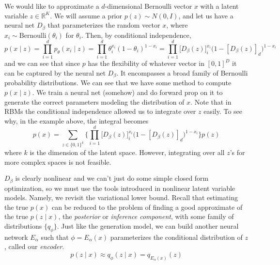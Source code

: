   \begin{example}
    \label{ex:bernoulli-bernoulli-rbm}
 
    We would like to approximate a $d$-dimensional Bernoulli vector $x$ with a latent variable $z \in \mathbb{R}^K$. We will assume a prior $p(z) \sim N(0, I)$, and let us have a neural net $D_{\beta}$ that parameterizes the random vector $x$, where $x_i \sim \mathrm{Bernoulli}(\theta_i)$ for $\theta_i$. Then, by conditional independence, 
    \begin{equation}
      p(x \mid z) = \prod_{i=1}^d p_\theta (x_i \mid z) = \prod_{i=1}^d \theta_i^{x_i} (1 - \theta_i)^{1 - x_i} = \prod_{i=1}^d \big[ D_\beta(z) \big]_i^{x_i} \big( 1 - [D_\beta(z)]_d \big)^{1 - x_i}
    \end{equation}
    and we can see that since $p$ has the flexibility of whatever vector in $[0, 1]^D$ it can be captured by the neural net $D_\beta$. It encompasses a broad family of Bernoulli probability distributions. We can see that we have some method to compute $p(x \mid z)$. We train a neural net (somehow) and do forward prop on it to generate the correct parameters modeling the distribution of $x$. Note that in RBMs the conditional independence allowed us to integrate over $z$ easily. To see why, in the example above, the integral becomes
    \begin{equation}
      p(x) = \sum_{z \in \{0, 1\}^k} \bigg\{ \prod_{i=1}^d \big[ D_\beta(z) \big]_i^{x_i} \big( 1 - [D_\beta(z)]_d \big)^{1 - x_i} \bigg\} p(z) 
    \end{equation}
    where $k$ is the dimension of the latent space. However, integrating over all $z$'s for more complex spaces is not feasible. 
  \end{example}

  $D_\beta$ is clearly nonlinear and we can't just do some simple closed form optimization, so we must use the tools introduced in nonlinear latent variable models. Namely, we revisit the variational lower bound. Recall that estimating the true $p(x)$ can be reduced to the problem of finding a good approximate of the true $p(z \mid x)$, the \textit{posterior} or \textit{inference component}, with some family of distributions $\{ q_\phi \}$. Just like the generation model, we can build another neural network $E_{\alpha}$ such that $\phi = E_{\alpha} (x)$ parameterizes the conditional distribution of $z$, called our \textit{encoder}. 
  \begin{equation}
    p(z \mid x) \approx q_\phi (z \mid x) = q_{E_\alpha (x)} (z)
  \end{equation}

